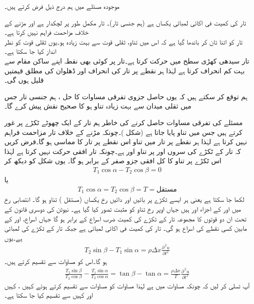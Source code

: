 موجودہ مسئلے میں ہم درج ذیل فرض کرتے ہیں۔

 \quad تار کی کمیت فی اکائی لمبائی یکساں ہے (ہم جنسی تار)۔ تار مکمل طور پر لچکدار ہے اور مڑنے کے خلاف مزاحمت فراہم نہیں کرتا ہے۔ \\
 \quad تار کو اتنا تان کر باندھا گیا ہے کہ اس میں تناو، ثقلی قوت سے بہت زیادہ ہو۔یوں ثقلی قوت کو نظر انداز کیا جا سکتا ہے۔\\
 \quad تار سیدھی کھڑی سطح میں حرکت کرتا ہے۔تار پر کوئی بھی نقطہ اپنے ساکن مقام سے بہت کم انحراف کرتا ہے لہٰذا ہر نقطے پر تار کی انحراف اور ڈھلوان کی مطلق قیمتیں قلیل ہوں گی۔ 


ہم توقع کر سکتے ہیں کہ یوں حاصل جزوی تفرقی مساوات کا حل ،     ہم جنسی تار جس میں ثقلی میدان سے بہت زیادہ تناو ہو  کا صحیح نقش پیش کرے گا۔  

مسئلے کی تفرقی مساوات حاصل کرنے کی خاطر ہم تار کے ایک چھوٹے ٹکڑے پر غور کرتے ہیں جس میں تناو  پایا جاتا ہے (شکل )۔چونکہ مڑنے کے خلاف تار مزاحمت فراہم نہیں کرتا ہے لہٰذا ہر نقطے پر تار میں تناو اس نقطے پر تار کا مماسی ہو گا۔فرض کریں کہ تار کے ٹکڑے  کی سروں  اور   پر تناو  اور  ہے۔چونکہ تار افقی حرکت نہیں کرتا ہے لہٰذا اس ٹکڑے پر تناو کا کل افقی جزو صفر کے برابر ہو گا۔ یوں شکل  کو دیکھ کر 
\begin{align*}
T_1\cos \alpha-T_2\cos \beta=0
\end{align*}
یا
\begin{align}\label{مساوات_جزوی_تار_الف}
T_1\cos \alpha=T_2\cos \beta=T=\text{مستقل}
\end{align}
لکھا جا سکتا ہے  یعنی ہر ایسے ٹکڑے پر بائیں اور دائیں رخ یکساں (مستقل ) تناو ہو گا۔ انتصابی رخ میں  اور  کے اجزاء  اور  ہیں جہاں اوپر رخ تناو کو مثبت تصور کیا گیا ہے۔ نیوٹن کی دوسری قانون کے تحت ان دو قوتوں کا مجموعہ تار کے ٹکڑے کی کمیت  ضرب  اسراع  کے برابر ہو گا جہاں اسراع،   اور  کے مابین کسی نقطے  کی اسراع ہو گی۔ تار کی کمیت فی اکائی لمبائی  ہے جبکہ تار کے ٹکڑے کی لمبائی  ہے۔یوں
\begin{align}\label{مساوات_جزوی_تار_ب}
T_2\sin \beta-T_1\sin \alpha=\rho\Delta x\frac{\partial^{\,2}u}{\partial t^2}
\end{align} 
ہو گا۔اس کو مساوات  سے تقسیم کرتے ہیں۔
\begin{align}\label{مساوات_جزوی_تار_پ}
\frac{T_2\sin \beta}{T_2\cos \beta}-\frac{T_1\sin \alpha}{T_2\cos \alpha}=\tan \beta -\tan \alpha=\frac{\rho \Delta x}{T}\frac{\partial^{\,2}u}{\partial t^2}
\end{align}
آپ تسلی کر لیں کہ چونکہ مساوات  میں  ہے لہٰذا مساوات  کو مساوات  سے تقسیم کرتے ہوئے کہیں ، کہیں  اور کہیں  سے تقسیم کیا جا سکتا ہے۔ 

